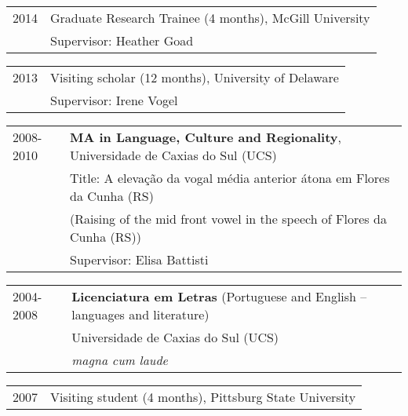 \documentclass[letterpaper,10pt]{article}
\begin{document}


 \begin{tabular}{p{1.6cm}p{14.6cm}}	   
2014 & Graduate Research Trainee (4 months), McGill University\\
    & Supervisor: Heather Goad
\end{tabular}

\begin{tabular}{p{1.6cm}p{14.6cm}}	 
2013 & Visiting scholar (12 months), University of Delaware\\
    & Supervisor: Irene Vogel 
    \end{tabular}
    
\begin{tabular}{p{1.6cm}p{14.6cm}}	
2008-2010 & \textbf{MA in Language, Culture and Regionality}, Universidade de Caxias do Sul (UCS)\\
    & Title: A eleva\c{c}\~ao da vogal m\'edia anterior \'atona em Flores da Cunha (RS)\\
    & (Raising of the mid front vowel in the speech of Flores da Cunha (RS))\\ %
    & Supervisor: Elisa Battisti
    \end{tabular}
 
 \begin{tabular}{p{1.6cm}p{14.6cm}}	  
2004-2008 & \textbf{Licenciatura em Letras} (Portuguese and English -- languages and literature)\\ 
    & Universidade de Caxias do Sul (UCS)\\
    & \textit{magna cum laude}
\end{tabular}

\begin{tabular}{p{1.6cm}p{14.6cm}}	

2007 & Visiting student (4 months), Pittsburg State University
\end{tabular}
\end{document}
